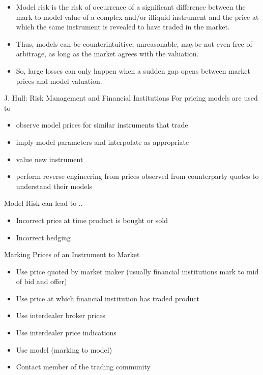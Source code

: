 \begin{itemize}
\item<1-> Model risk is the risk of occurrence of a significant difference between the mark-to-model value of a complex and/or illiquid instrument and the price at which the same instrument is revealed to have traded in the market.
\item<2-> Thus, models can be counterintuitive, unreasonable, maybe not even free of arbitrage, as long as the market agrees with the valuation.
\item<3-> So, large losses  can only happen when a sudden gap opens between market prices and model valuation.
\end{itemize}




{J. Hull: Risk Management and Financial Institutions}
For pricing models are used to
\begin{itemize}
\item<1-> observe model prices for similar instruments that trade
\item<2-> imply model parameters and interpolate as appropriate
\item<3-> value new instrument
\item<4-> perform reverse engineering from prices observed from counterparty quotes to understand their models
\end{itemize}
Model Risk can lead to ..
\begin{itemize}
\item<1->
Incorrect price at time product is bought or sold
\item<2-> Incorrect hedging
\end{itemize}


{Marking Prices of an Instrument to Market}
\begin{itemize}
\item<1->
Use price quoted by market maker (usually financial institutions mark to mid of bid and offer)
\item<2-> Use price at which financial institution has traded product
\item<3-> Use interdealer broker prices
\item<4-> Use interdealer price indications
\item<5-> Use model (marking to model)
\item<6-> Contact member of the trading community
\end{itemize}



